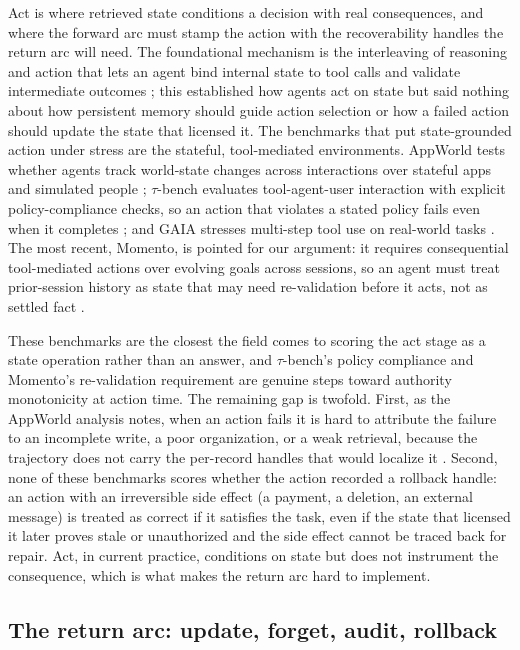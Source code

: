Act is where retrieved state conditions a decision with real consequences, and where the forward arc must stamp the action with the recoverability handles the return arc will need. The foundational mechanism is the interleaving of reasoning and action that lets an agent bind internal state to tool calls and validate intermediate outcomes \citep{yao2023reactsynergizingreasoningacting}; this established how agents act on state but said nothing about how persistent memory should guide action selection or how a failed action should update the state that licensed it. The benchmarks that put state-grounded action under stress are the stateful, tool-mediated environments. AppWorld tests whether agents track world-state changes across interactions over stateful apps and simulated people \citep{trivedi-etal-2024-appworld}; $\tau$-bench evaluates tool-agent-user interaction with explicit policy-compliance checks, so an action that violates a stated policy fails even when it completes \citep{yao2024taubenchbenchmarktoolagentuserinteraction}; and GAIA stresses multi-step tool use on real-world tasks \citep{mialon2023gaia}. The most recent, Momento, is pointed for our argument: it requires consequential tool-mediated actions over evolving goals across sessions, so an agent must treat prior-session history as state that may need re-validation before it acts, not as settled fact \citep{merin2026momento}.

These benchmarks are the closest the field comes to scoring the act stage as a state operation rather than an answer, and $\tau$-bench's policy compliance and Momento's re-validation requirement are genuine steps toward authority monotonicity at action time. The remaining gap is twofold. First, as the AppWorld analysis notes, when an action fails it is hard to attribute the failure to an incomplete write, a poor organization, or a weak retrieval, because the trajectory does not carry the per-record handles that would localize it \citep{trivedi-etal-2024-appworld}. Second, none of these benchmarks scores whether the action recorded a rollback handle: an action with an irreversible side effect (a payment, a deletion, an external message) is treated as correct if it satisfies the task, even if the state that licensed it later proves stale or unauthorized and the side effect cannot be traced back for repair. Act, in current practice, conditions on state but does not instrument the consequence, which is what makes the return arc hard to implement.

\subsection{The return arc: update, forget, audit, rollback}\label{subsec:return}

